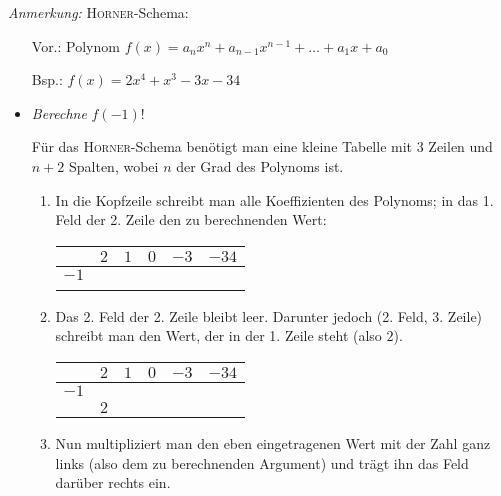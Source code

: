 \documentclass[%
a4paper,
11pt,		%
]
{scrartcl}
\theoremstyle{plain}
\theoremstyle{plain}
\theoremstyle{plain}
\theoremstyle{plain}
\theoremstyle{plain}
\begin{document}

\textit{Anmerkung:}
\textsc{Horner}-Schema:
\begin{itemize}
    \item[Vor.:] Polynom $f(x) = a_n x^n + a_{n-1} x^{n-1} + \ldots + a_1 x + a_0$
    \item[Bsp.:] $f(x) = 2x^4 + x^3 -3x -34$
\end{itemize}
\begin{itemize}
    \item \textit{Berechne} $f(-1)$!

        Für das \textsc{Horner}-Schema benötigt man eine kleine Tabelle mit 3 Zeilen und $n+2$ Spalten, wobei $n$ der Grad des Polynoms ist.
        \begin{enumerate}
            \item In die Kopfzeile schreibt man alle Koeffizienten des Polynoms; in das 1. Feld der 2. Zeile den zu berechnenden Wert:
                \begin{center}
                    \begin{tabular}{c|ccccc}
                        & $2$   & $1$   & $0$   & $-3$  & $-34$ \\\hline
                        $-1$    &       &       &       &       &       \\\hline
                        \phantom{$-1$}
                    \end{tabular}
                \end{center}
            \item Das 2. Feld der 2. Zeile bleibt leer. Darunter jedoch (2. Feld, 3. Zeile) schreibt man den Wert, der in der 1. Zeile steht (also $2$).
                \begin{center}
                    \begin{tabular}{c|ccccc}
                        & $2$   & $1$   & $0$   & $-3$  & $-34$ \\\hline
                        $-1$    &       &       &       &       &       \\\hline
                        & $2$
                    \end{tabular}
                \end{center}
            \item Nun multipliziert man den eben eingetragenen Wert mit der Zahl ganz links (also dem zu berechnenden Argument) und trägt ihn das Feld darüber rechts ein.
                \begin{center}
                    \begin{tabular}{c|ccccc}

\end{tabular}
\end{center}
\end{enumerate}
\end{itemize}
\end{document}
